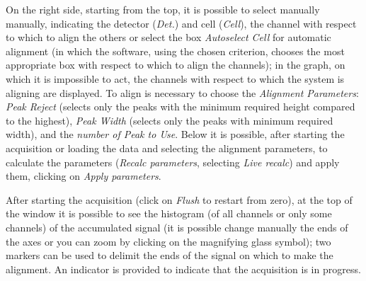 \documentclass[a4paper,12pt,oneside,pdflatex,italian,final,twocolumn]{article}
\begin{document}
On the right side, starting from the top, it is possible to select manually manually, indicating the detector (\textit{Det.}) and cell (\textit{Cell}), the channel with respect to which to align the others or select the box \textit{Autoselect Cell} for automatic alignment (in which the software, using the chosen criterion, chooses the most appropriate box with respect to which to align the channels); in the graph, on which it is impossible to act, the channels with respect to which the system is aligning are displayed.
To align is necessary to choose the \textit{Alignment Parameters}: \textit{Peak Reject} (selects only the peaks with the minimum required height compared to the highest), \textit{Peak Width} (selects only the peaks with minimum required width), and the \textit{number of Peak to Use}.  
Below it is possible, after starting the acquisition or loading the data and selecting the alignment parameters, to calculate the parameters (\textit{Recalc parameters}, selecting \textit{Live recalc}) and apply them, clicking on \textit{Apply parameters}.

After starting the acquisition (click on \textit{Flush} to restart from zero), at the top of the window it is possible to see the histogram (of all channels or only some channels) of the accumulated signal (it is possible change manually the ends of the axes or you can zoom by clicking on the magnifying glass symbol); two markers can be used to delimit the ends of the signal on which to make the alignment. An indicator is provided to indicate that the acquisition is in progress.
\end{document}
